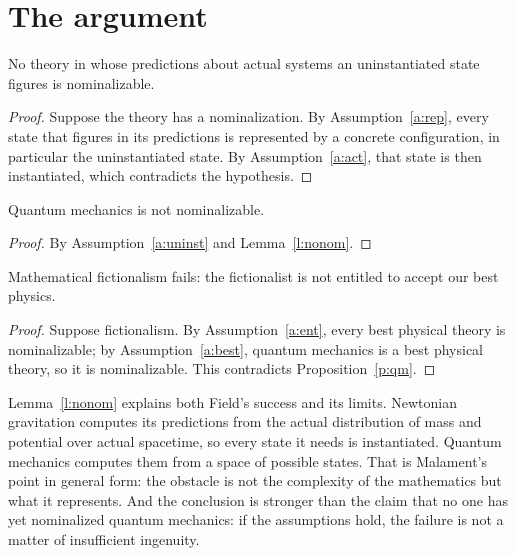 \documentclass{situationist-preprint}
\begin{document}
\section{The argument}

\begin{lemma}\label{l:nonom}
No theory in whose predictions about actual systems an uninstantiated state figures is nominalizable.
\end{lemma}

\begin{proof}
Suppose the theory has a nominalization. By Assumption~\ref{a:rep}, every state that figures in its predictions is represented by a concrete configuration, in particular the uninstantiated state. By Assumption~\ref{a:act}, that state is then instantiated, which contradicts the hypothesis.
\end{proof}

\begin{proposition}\label{p:qm}
Quantum mechanics is not nominalizable.
\end{proposition}

\begin{proof}
By Assumption~\ref{a:uninst} and Lemma~\ref{l:nonom}.
\end{proof}

\begin{theorem}\label{t:main}
Mathematical fictionalism fails: the fictionalist is not entitled to accept our best physics.
\end{theorem}

\begin{proof}
Suppose fictionalism. By Assumption~\ref{a:ent}, every best physical theory is nominalizable; by Assumption~\ref{a:best}, quantum mechanics is a best physical theory, so it is nominalizable. This contradicts Proposition~\ref{p:qm}.
\end{proof}

Lemma~\ref{l:nonom} explains both Field's success and its limits. Newtonian gravitation computes its predictions from the actual distribution of mass and potential over actual spacetime, so every state it needs is instantiated. Quantum mechanics computes them from a space of possible states. That is Malament's point in general form: the obstacle is not the complexity of the mathematics but what it represents. And the conclusion is stronger than the claim that no one has yet nominalized quantum mechanics: if the assumptions hold, the failure is not a matter of insufficient ingenuity.
\end{document}
